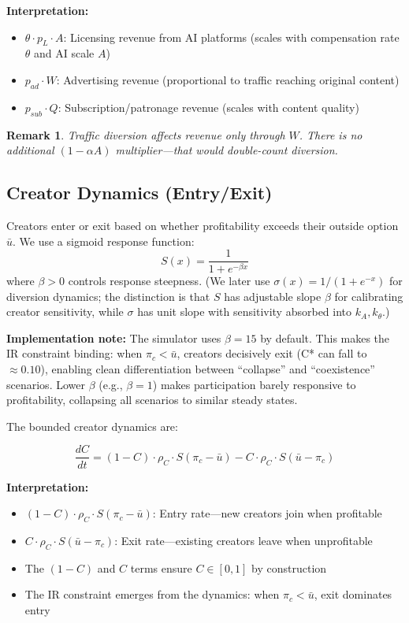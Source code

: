 \documentclass[11pt,a4paper]{article}
\newtheorem{remark}{Remark}
\begin{document}
\textbf{Interpretation:}
\begin{itemize}
    \item $\theta \cdot p_L \cdot A$: Licensing revenue from AI platforms (scales with compensation rate $\theta$ and AI scale $A$)
    \item $p_{ad} \cdot W$: Advertising revenue (proportional to traffic reaching original content)
    \item $p_{sub} \cdot Q$: Subscription/patronage revenue (scales with content quality)
\end{itemize}

\begin{remark}
Traffic diversion affects revenue \emph{only} through $W$. There is no additional $(1-\alpha A)$ multiplier---that would double-count diversion.
\end{remark}

\subsection{Creator Dynamics (Entry/Exit)}

Creators enter or exit based on whether profitability exceeds their outside option $\bar{u}$. We use a sigmoid response function:
\begin{equation}
S(x) = \frac{1}{1 + e^{-\beta x}}
\end{equation}
where $\beta > 0$ controls response steepness. (We later use $\sigma(x) = 1/(1+e^{-x})$ for diversion dynamics; the distinction is that $S$ has adjustable slope $\beta$ for calibrating creator sensitivity, while $\sigma$ has unit slope with sensitivity absorbed into $k_A, k_\theta$.)

\textbf{Implementation note:} The simulator uses $\beta = 15$ by default. This makes the IR constraint binding: when $\pi_c < \bar{u}$, creators decisively exit (C* can fall to $\approx 0.10$), enabling clean differentiation between ``collapse'' and ``coexistence'' scenarios. Lower $\beta$ (e.g., $\beta = 1$) makes participation barely responsive to profitability, collapsing all scenarios to similar steady states.

The bounded creator dynamics are:

\begin{equation}
\boxed{
\frac{dC}{dt} = (1-C) \cdot \rho_C \cdot S(\pi_c - \bar{u}) - C \cdot \rho_C \cdot S(\bar{u} - \pi_c)
}
\end{equation}

\textbf{Interpretation:}
\begin{itemize}
    \item $(1-C) \cdot \rho_C \cdot S(\pi_c - \bar{u})$: Entry rate---new creators join when profitable
    \item $C \cdot \rho_C \cdot S(\bar{u} - \pi_c)$: Exit rate---existing creators leave when unprofitable
    \item The $(1-C)$ and $C$ terms ensure $C \in [0,1]$ by construction
    \item The IR constraint emerges from the dynamics: when $\pi_c < \bar{u}$, exit dominates entry
\end{itemize}
\end{document}
